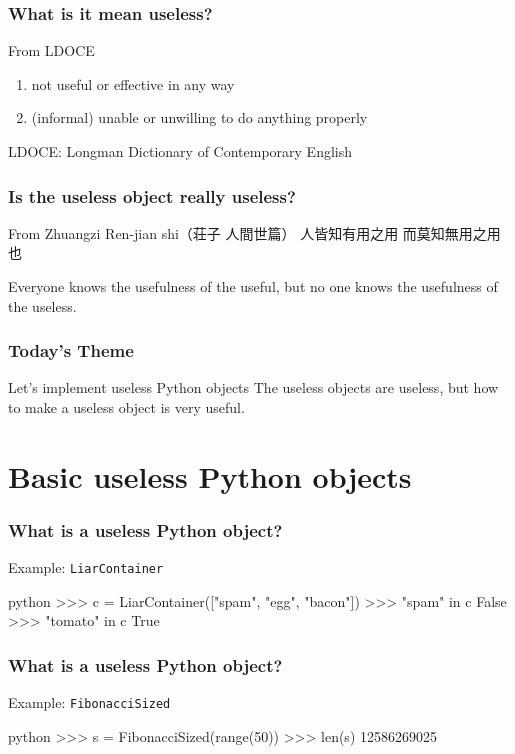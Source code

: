 \documentclass[aspectratio=169,dvipdfmx,12pt,notheorems]{beamer}
\theoremstyle{definition}
\begin{document}
\begin{frame}\frametitle{What is it mean useless?}

\begin{block}{From LDOCE}
\begin{enumerate}
\item not useful or effective in any way
\item (informal) unable or unwilling to do anything properly
\end{enumerate}
\end{block}
LDOCE: Longman Dictionary of Contemporary English
\end{frame}

\begin{frame}\frametitle{Is the useless object really useless?}

\begin{block}{From Zhuangzi Ren-jian shi（荘子 人間世篇）}
人皆知有用之用 而莫知無用之用也
\end{block}
Everyone knows the usefulness of the useful, but no one knows the usefulness of the useless.

\end{frame}

\begin{frame}\frametitle{Today's Theme}

\begin{block}{Let's implement useless Python objects}
The useless objects are useless, but how to make a useless object is very useful.
\end{block}

\end{frame}

\section{Basic useless Python objects}

\begin{frame}[fragile]\frametitle{What is a useless Python object?}

\begin{exampleblock}{Example: \texttt{LiarContainer}}
\begin{pygments}{python}
>>> c = LiarContainer(["spam", "egg", "bacon"])
>>> "spam" in c
False
>>> "tomato" in c
True
\end{pygments}
\end{exampleblock}

\end{frame}
\begin{frame}[fragile]\frametitle{What is a useless Python object?}

\begin{exampleblock}{Example: \texttt{FibonacciSized}}
\begin{pygments}{python}
>>> s = FibonacciSized(range(50))
>>> len(s)
12586269025
\end{pygments}
\end{exampleblock}

\end{frame}
\end{document}
